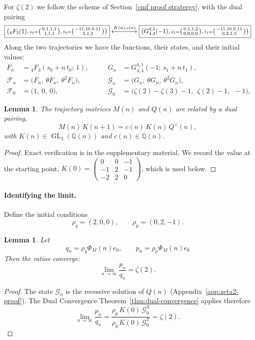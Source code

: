 \documentclass[oneside,english,11pt]{amsart}
\newtheorem{lemma}[thm]{Lemma}
\begin{document}
For $\zeta(2)$ we follow the scheme of Section~\ref{cmf proof stratergy},
with the dual pairing
{\setlength{\fboxsep}{2pt}%
\[
  \boxed{\bigl({}_4F_3(1),{\scriptstyle s_0=}\bigl(\begin{smallmatrix}0,1,1,1\\1,1,1\end{smallmatrix}\bigr),
         {\scriptstyle t_0=}\bigl(\begin{smallmatrix}-11,10,9,11\\2,1,3\end{smallmatrix}\bigr)\bigr)}
  \xleftrightarrow{K(n),c(n)}
  \boxed{\bigl(G^{4,1}_{4,4}(-1),{\scriptstyle s_1=}\bigl(\begin{smallmatrix}0,1,1,2\\0,0,0,0\end{smallmatrix}\bigr),
         {\scriptstyle t_1=}\bigl(\begin{smallmatrix}-11,10,9,11\\0,2,1,3\end{smallmatrix}\bigr)\bigr)}
\]}
Along the two trajectories we have the functions, their states, and their
initial values:
\[
\begin{aligned}
  F_n&={}_4F_3(s_0+n\,t_0;\,1),
  &\qquad
  G_n&=G^{4,1}_{4,4}(-1;\,s_1+n\,t_1),\\[2pt]
  \mathcal F_n&=\bigl(F_n,\ \theta F_n,\ \theta^2F_n\bigr),
  &\qquad
  \mathcal G_n&=\bigl(G_n,\ \theta G_n,\ \theta^2G_n\bigr),\\[2pt]
  \mathcal F_0&=\bigl(1,\ 0,\ 0\bigr),
  &\qquad
  \mathcal G_0&=\bigl(\zeta(2)-\zeta(3)-1,\ \ \zeta(2)-1,\ \ -1\bigr),
\end{aligned}
\]


\begin{lemma}\label{lem:z2-connection}
The trajectory matrices $M(n)$ and $Q(n)$ are related by a dual pairing,
\[
  M(n)\,K(n+1)=c(n)\,K(n)\,Q^\vee(n),
\]
with $K(n)\in\operatorname{GL}_3(\mathbb Q(n))$ and $c(n)\in\mathbb Q(n)$.
\end{lemma}

\begin{proof}
Exact verification is in the supplementary material. We record the value at the starting point,
$K(0)=\left(\begin{smallmatrix}0&0&-1\\-1&2&-1\\-2&2&0\end{smallmatrix}\right)$,
which is used below.
\end{proof}

\paragraph{Identifying the limit.}
Define the initial conditions
\[
  \rho_q=(2,0,0),\qquad \rho_{p}=(0,2,-1).
\]
\begin{lemma}\label{lem:z2-limits}
Let
\[
  q_n=\rho_q\Phi_M(n)e_0,\qquad
  p_{n}=\rho_{p}\Phi_M(n)e_0
\]
Then the ratios converge:
\[
  \lim_{n\to\infty}\frac{p_{n}}{q_n}=\zeta(2).
\]
\end{lemma}

\begin{proof}
The state $\mathcal G_n$ is the recessive solution of $Q(n)$
(Appendix~\ref{app:zeta2-proof}).
The Dual Convergence Theorem~\ref{thm:dual-convergence} applies
therefore
\[
  \lim_{n\to\infty}\frac{p_{n}}{q_n}
  =\frac{\rho_{p}\,K(0)\,\mathcal G_0^{\mathsf T}}{\rho_q\,K(0)\,\mathcal G_0^{\mathsf T}}
  =\zeta(2).
\]
\end{proof}
\end{document}
